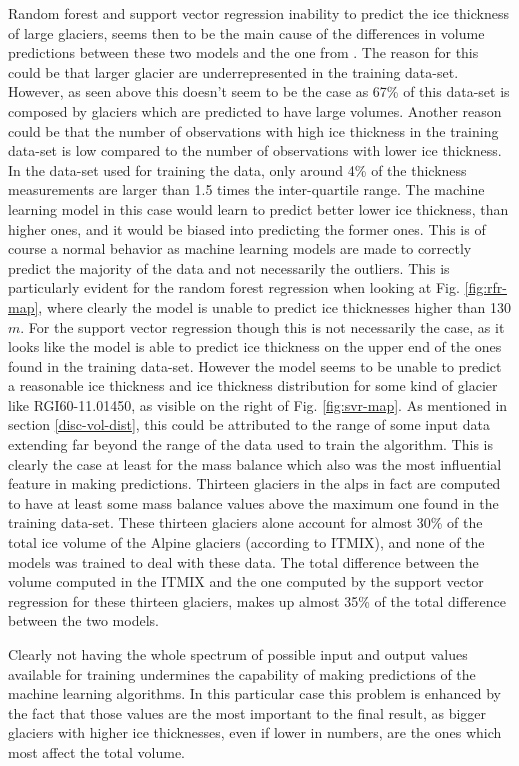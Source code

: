 Random forest and support vector regression inability to predict the ice thickness of large glaciers, seems then to be the main cause of the differences in volume predictions between these two models and the one from \citet{Farinotti2019}.
The reason for this could be that larger glacier are underrepresented in the training data-set. However, as seen above this doesn't seem to be the case as 67\% of this data-set is composed by glaciers which are predicted to have large volumes.
Another reason could be that the number of observations with high ice thickness in the training data-set is low compared to the number of observations with lower ice thickness. In the data-set used for training the data, only around 4\% of the thickness measurements are larger than 1.5 times the inter-quartile range. The machine learning model in this case would learn to predict better lower ice thickness, than higher ones, and it would be biased into predicting the former ones. This is of course a normal behavior as machine learning models are made to correctly predict the majority of the data and not necessarily the outliers. This is particularly evident for the random forest regression when looking at Fig. \ref{fig:rfr-map}, where clearly the model is unable to predict ice thicknesses higher than 130$m$.
For the support vector regression though this is not necessarily the case, as it looks like the model is able to predict ice thickness on the upper end of the ones found in the training data-set. However the model seems to be unable to predict a reasonable ice thickness and ice thickness distribution for some kind of glacier like RGI60-11.01450, as visible on the right of Fig. \ref{fig:svr-map}. As mentioned in section \ref{disc-vol-dist}, this could be attributed to the range of some input data extending far beyond the range of the data used to train the algorithm. This is clearly the case at least for the mass balance which also was the most influential feature in making predictions. Thirteen glaciers in the alps in fact are computed to have at least some mass balance values above the maximum one found in the training data-set. These thirteen glaciers alone account for almost 30\% of the total ice volume of the Alpine glaciers (according to ITMIX), and none of the models was trained to deal with these data. The total difference between the volume computed in the ITMIX and the one computed by the support vector regression for these thirteen glaciers, makes up almost 35\% of the total difference between the two models.
 
Clearly not having the whole spectrum of possible input and output values available for training undermines the capability of making predictions of the machine learning algorithms. In this particular case this problem is enhanced by the fact that those values are the most important to the final result, as bigger glaciers with higher ice thicknesses, even if lower in numbers, are the ones which most affect the total volume. 


